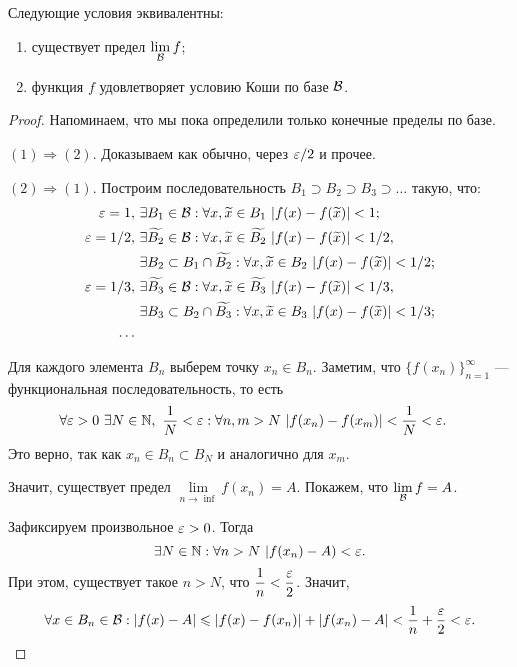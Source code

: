 \documentclass[a4paper, 12pt]{article}
\begin{document}
\begin{Theorem}
Следующие условия эквивалентны:
\begin{enumerate}
\item существует предел $\lim\limits_{\mathcal{B}} f$;
\item функция $f$ удовлетворяет условию Коши по базе $\mathcal{B}$.
\end{enumerate}
\begin{proof}
Напоминаем, что мы пока определили только конечные пределы по базе.

$(1) \Rightarrow (2)$. Доказываем как обычно, через $\varepsilon/2$ и прочее.

$(2) \Rightarrow (1)$. Построим последовательность $B_1 \supset B_2 \supset B_3 \supset \ldots$ такую, что:
\begin{align}
\eps = 1, &\ \exists B_1 \in \B: \forall x, \widetilde{x} \in B_1\ |f(x) - f(\widetilde{x})| < 1;\\
\eps = 1/2,&\ \exists \widetilde{B_2} \in \B: \forall x, \widetilde{x} \in \widetilde{B_2}\ |f(x) - f(\widetilde{x})| < 1/2,\\
&\ \exists B_2 \subset B_1 \cap \widetilde{B_2}: \forall x, \widetilde{x} \in B_2\ |f(x) - f(\widetilde{x})| < 1/2;\\ 
\eps = 1/3,&\ \exists \widetilde{B_3} \in \B: \forall x, \widetilde{x} \in \widetilde{B_3}\ |f(x) - f(\widetilde{x})| < 1/3, \\
&\ \exists B_3 \subset B_2 \cap \widetilde{B_3}: \forall x, \widetilde{x} \in B_3\ |f(x) - f(\widetilde{x})| < 1/3;\\ 
\ldots
\end{align}

Для каждого элемента $B_n$ выберем точку $x_n \in B_n$. Заметим, что $\{ f(x_n) \}_{n=1}^\infty$ --- функциональная последовательность, то есть
\begin{align}
&\forall \varepsilon > 0\ \exists N \in \mathbb{N},\ \frac{1}{N} < \varepsilon: \forall n, m > N \ |f(x_n) - f(x_m)| < \frac{1}{N} < \varepsilon.
\end{align}
Это верно, так как $x_n \in B_n \subset B_N$ и аналогично для $x_m$.

Значит, существует предел $\lim\limits_{n\to \inf}f(x_n) = A$. Покажем, что $\lim\limits_{\mathcal{B}}f = A$.

Зафиксируем произвольное $\varepsilon > 0$.  Тогда
$$
\exists N \in \mathbb{N}: \forall n > N\ |f(x_n) - A) < \varepsilon.
$$
При этом, существует такое $n>N$, что $\dfrac{1}{n} < \dfrac{\varepsilon}{2}$. Значит,
$$
\forall x \in B_n \in \mathcal{B}: |f(x) - A| \leqslant |f(x) - f(x_n)| + |f(x_n) - A| < \frac{1}{n} + \frac{\varepsilon}{2} < \varepsilon.
$$
\end{proof}
\end{Theorem}
\end{document}
